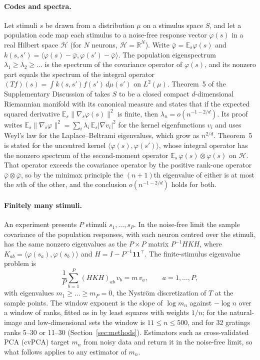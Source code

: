 \documentclass[11pt]{article}
\theoremstyle{definition}
\begin{document}
\paragraph{Codes and spectra.} Let stimuli $s$ be drawn from a distribution $\mu$ on a stimulus space $S$, and let a population code map each stimulus to a noise-free response vector $\varphi(s)$ in a real Hilbert space $\mathcal{H}$ (for $N$ neurons, $\mathcal{H} = \mathbb{R}^N$). Write $\bar\varphi = \mathbb{E}_s \varphi(s)$ and $k(s, s') = \langle \varphi(s) - \bar\varphi, \varphi(s') - \bar\varphi \rangle$. The population eigenspectrum $\lambda_1 \ge \lambda_2 \ge \dots$ is the spectrum of the covariance operator of $\varphi(s)$, and its nonzero part equals the spectrum of the integral operator $(Tf)(s) = \int k(s, s') f(s')\, d\mu(s')$ on $L^2(\mu)$. Theorem~5 of the Supplementary Discussion of \cite{stringer2019} takes $S$ to be a closed compact $d$-dimensional Riemannian manifold with its canonical measure and states that if the expected squared derivative $\mathbb{E}_s \|\nabla_s \varphi(s)\|^2$ is finite, then $\lambda_n = o(n^{-1-2/d})$. Its proof writes $\mathbb{E}_s\|\nabla_s\varphi\|^2 = \sum_i \lambda_i\, \mathbb{E}_s|\nabla v_i|^2$ for the kernel eigenfunctions $v_i$ and uses Weyl's law for the Laplace--Beltrami eigenvalues, which grow as $n^{2/d}$. Theorem~5 is stated for the uncentred kernel $\langle \varphi(s), \varphi(s') \rangle$, whose integral operator has the nonzero spectrum of the second-moment operator $\mathbb{E}_s\, \varphi(s) \otimes \varphi(s)$ on $\mathcal{H}$. That operator exceeds the covariance operator by the positive rank-one operator $\bar\varphi \otimes \bar\varphi$, so by the minimax principle the $(n+1)$th eigenvalue of either is at most the $n$th of the other, and the conclusion $o(n^{-1-2/d})$ holds for both.

\paragraph{Finitely many stimuli.} An experiment presents $P$ stimuli $s_1, \dots, s_P$. In the noise-free limit the sample covariance of the population responses, with each neuron centred over the stimuli, has the same nonzero eigenvalues as the $P \times P$ matrix $P^{-1} H K H$, where $K_{ab} = \langle \varphi(s_a), \varphi(s_b) \rangle$ and $H = I - P^{-1}\mathbf{1}\mathbf{1}^{\top}$. The finite-stimulus eigenvalue problem is
\begin{equation}\label{eq:nystrom}
  \frac{1}{P} \sum_{b=1}^{P} (HKH)_{ab}\, v_b = m\, v_a, \qquad a = 1, \dots, P,
\end{equation}
with eigenvalues $m_1 \ge \dots \ge m_P = 0$, the Nystr\"om discretization of $T$ at the sample points. The window exponent is the slope of $\log m_n$ against $-\log n$ over a window of ranks, fitted as in \cite{stringer2019} by least squares with weights $1/n$; for the natural-image and low-dimensional sets the window is $11 \le n \le 500$, and for 32 gratings ranks 5--30 or 11--30 (Section~\ref{sec:methods}). Estimators such as cross-validated PCA (cvPCA) target $m_n$ from noisy data and return it in the noise-free limit, so what follows applies to any estimator of $m_n$.
\end{document}
